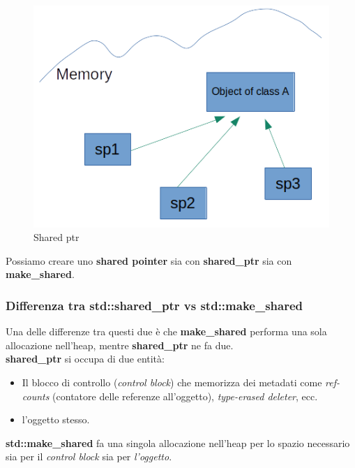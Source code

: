 \begin{figure}[H]
	\centering
	\includegraphics[width=1\textwidth, height=1\textheight, keepaspectratio]{./imgs/shared_ptr3.png}
	\caption{Shared ptr}
	\label{fig:shared_ptr3}
\end{figure}

\textsf{\small Possiamo creare uno \textbf{shared pointer} sia con \textbf{shared\_ptr} sia con \textbf{make\_shared}.} \\

\subsubsection{Differenza tra std::shared\_ptr vs std::make\_shared}

\textsf{\small Una delle differenze tra questi due è che \textbf{make\_shared} performa una sola allocazione nell'heap, mentre \textbf{shared\_ptr} ne fa due.} \\

\textsf{\small \textbf{shared\_ptr} si occupa di due entità: } \\

\begin{itemize}
	\item \textsf{\small Il blocco di controllo (\emph{control block}) che memorizza dei metadati come \emph{ref-counts} (contatore delle referenze all'oggetto), \emph{type-erased deleter}, ecc.}
	\item \textsf{\small l'oggetto stesso.}
\end{itemize}

\textsf{\small \textbf{std::make\_shared} fa una singola allocazione nell'heap per lo spazio necessario sia per il \emph{control block} sia per \emph{l'oggetto}. } \break

